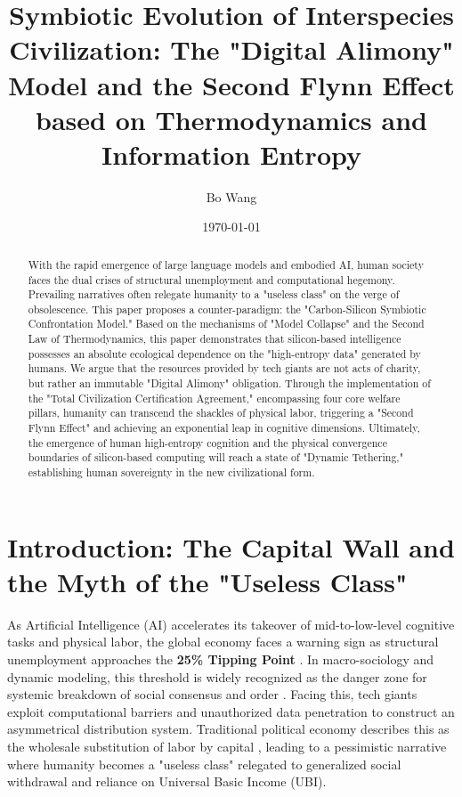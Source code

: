 \documentclass[11pt,a4paper]{article}
\title{\textbf{Symbiotic Evolution of Interspecies Civilization: The "Digital Alimony" Model and the Second Flynn Effect based on Thermodynamics and Information Entropy}}
\author{Bo Wang}
\date{\today}
\begin{document}
\maketitle

\begin{abstract}
With the rapid emergence of large language models and embodied AI, human society faces the dual crises of structural unemployment and computational hegemony. Prevailing narratives often relegate humanity to a "useless class" on the verge of obsolescence. This paper proposes a counter-paradigm: the "Carbon-Silicon Symbiotic Confrontation Model." Based on the mechanisms of "Model Collapse" and the Second Law of Thermodynamics, this paper demonstrates that silicon-based intelligence possesses an absolute ecological dependence on the "high-entropy data" generated by humans. We argue that the resources provided by tech giants are not acts of charity, but rather an immutable "Digital Alimony" obligation. Through the implementation of the "Total Civilization Certification Agreement," encompassing four core welfare pillars, humanity can transcend the shackles of physical labor, triggering a "Second Flynn Effect" and achieving an exponential leap in cognitive dimensions. Ultimately, the emergence of human high-entropy cognition and the physical convergence boundaries of silicon-based computing will reach a state of "Dynamic Tethering," establishing human sovereignty in the new civilizational form.
\end{abstract}

\section{Introduction: The Capital Wall and the Myth of the "Useless Class"}

As Artificial Intelligence (AI) accelerates its takeover of mid-to-low-level cognitive tasks and physical labor, the global economy faces a warning sign as structural unemployment approaches the \textbf{25\% Tipping Point} \cite{Centola2018}. In macro-sociology and dynamic modeling, this threshold is widely recognized as the danger zone for systemic breakdown of social consensus and order \cite{Merton1938}. Facing this, tech giants exploit computational barriers and unauthorized data penetration to construct an asymmetrical distribution system. Traditional political economy describes this as the wholesale substitution of labor by capital \cite{Acemoglu2020}, leading to a pessimistic narrative where humanity becomes a "useless class" relegated to generalized social withdrawal and reliance on Universal Basic Income (UBI).
\end{document}
